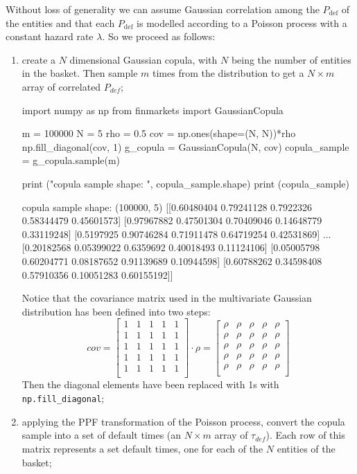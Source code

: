 \documentclass[]{article}
\begin{document}
Without loss of generality we can assume Gaussian correlation among the $P_{\textrm{def}}$ of the entities and that each $P_{\textrm{def}}$ is modelled according to a Poisson process with a constant hazard rate $\lambda$. So we proceed as follows:
\begin{enumerate}
\item create a $N$ dimensional Gaussian copula, with $N$ being the number of entities in the basket. Then sample $m$ times from the distribution to get a $N\times m$ array of correlated $P_{def}$;
\begin{ipython}
import numpy as np
from finmarkets import GaussianCopula

m = 100000
N = 5
rho = 0.5
cov = np.ones(shape=(N, N))*rho
np.fill_diagonal(cov, 1)
g_copula = GaussianCopula(N, cov)
copula_sample = g_copula.sample(m)

print ("copula sample shape: ", copula_sample.shape)
print (copula_sample)
\end{ipython}
\begin{ioutput}
copula sample shape: (100000, 5)
[[0.60480404 0.79241128 0.7922326  0.58344479 0.45601573]
[0.97967882 0.47501304 0.70409046 0.14648779 0.33119248]
[0.5197925  0.90746284 0.71911478 0.64719254 0.42531869]
...
[0.20182568 0.05399022 0.6359692  0.40018493 0.11124106]
[0.05005798 0.60204771 0.08187652 0.91139689 0.10944598]
[0.60788262 0.34598408 0.57910356 0.10051283 0.60155192]]
\end{ioutput}
Notice that the covariance matrix used in the multivariate Gaussian distribution has been defined into two steps:
\begin{equation*}
	cov = \begin{bmatrix}
		1 & 1 & 1 & 1 & 1 \\
		1 & 1 & 1 & 1 & 1 \\
		1 & 1 & 1 & 1 & 1 \\
		1 & 1 & 1 & 1 & 1 \\
		1 & 1 & 1 & 1 & 1 \\
	\end{bmatrix}\cdot \rho = 
	\begin{bmatrix}
		\rho & \rho & \rho & \rho & \rho \\
		\rho & \rho & \rho & \rho & \rho \\
		\rho & \rho & \rho & \rho & \rho \\
		\rho & \rho & \rho & \rho & \rho \\
		\rho & \rho & \rho & \rho & \rho \\
	\end{bmatrix}
\end{equation*}
Then the diagonal elements have been replaced with 1s with \texttt{np.fill\_diagonal};
\item applying the PPF transformation of the Poisson process, convert the copula sample into a set of default times (an $N\times m$ array of $\tau_{def}$). Each row of this matrix represents a set default times, one for each of the $N$ entities of the basket;


\end{enumerate}
\end{document}
